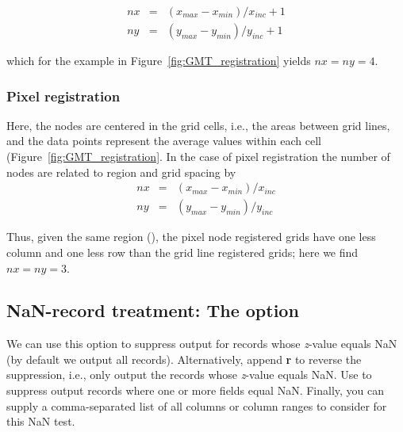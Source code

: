 \[ \begin{array}{ccl} 
nx & =  &       (x_{max} - x_{min}) / x_{inc} + 1       \\ 
ny & =  &       (y_{max} - y_{min}) / y_{inc} + 1
\end{array} \]

which for the example in Figure~\ref{fig:GMT_registration} yields $nx = ny = 4$.



\subsubsection{Pixel registration}

Here, the nodes are centered in the grid cells, i.e., the areas
between grid lines, and the data points represent the average
values within each cell (Figure~\ref{fig:GMT_registration}.
In the case of pixel registration the number of nodes are related
to region and grid spacing by \\

\[ \begin{array}{ccl} 
nx & =  &       (x_{max} - x_{min}) / x_{inc}   \\ 
ny & =  &       (y_{max} - y_{min}) / y_{inc}
\end{array} \]

Thus, given the same region (), the pixel node registered grids have one less
column and one less row than the grid line registered grids; here we
find $nx = ny = 3$.


\subsection{NaN-record treatment: The  option}

We can use this option to suppress output for records whose {\it z}-value equals NaN
(by default we output all records).  Alternatively, append {\bf r} to reverse the suppression,
i.e., only output the records whose {\it z}-value equals NaN.  Use  to suppress
output records where one or more fields equal NaN.  Finally, you can supply
a comma-separated list of all columns or column ranges to consider for this NaN test.


